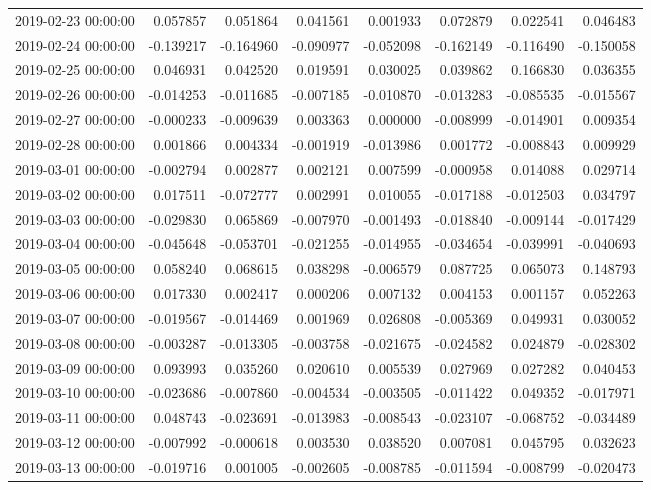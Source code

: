 \begin{tabular}{lrrrrrrr}
2019-02-23 00:00:00 & 0.057857 & 0.051864 & 0.041561 & 0.001933 & 0.072879 & 0.022541 & 0.046483 \\
2019-02-24 00:00:00 & -0.139217 & -0.164960 & -0.090977 & -0.052098 & -0.162149 & -0.116490 & -0.150058 \\
2019-02-25 00:00:00 & 0.046931 & 0.042520 & 0.019591 & 0.030025 & 0.039862 & 0.166830 & 0.036355 \\
2019-02-26 00:00:00 & -0.014253 & -0.011685 & -0.007185 & -0.010870 & -0.013283 & -0.085535 & -0.015567 \\
2019-02-27 00:00:00 & -0.000233 & -0.009639 & 0.003363 & 0.000000 & -0.008999 & -0.014901 & 0.009354 \\
2019-02-28 00:00:00 & 0.001866 & 0.004334 & -0.001919 & -0.013986 & 0.001772 & -0.008843 & 0.009929 \\
2019-03-01 00:00:00 & -0.002794 & 0.002877 & 0.002121 & 0.007599 & -0.000958 & 0.014088 & 0.029714 \\
2019-03-02 00:00:00 & 0.017511 & -0.072777 & 0.002991 & 0.010055 & -0.017188 & -0.012503 & 0.034797 \\
2019-03-03 00:00:00 & -0.029830 & 0.065869 & -0.007970 & -0.001493 & -0.018840 & -0.009144 & -0.017429 \\
2019-03-04 00:00:00 & -0.045648 & -0.053701 & -0.021255 & -0.014955 & -0.034654 & -0.039991 & -0.040693 \\
2019-03-05 00:00:00 & 0.058240 & 0.068615 & 0.038298 & -0.006579 & 0.087725 & 0.065073 & 0.148793 \\
2019-03-06 00:00:00 & 0.017330 & 0.002417 & 0.000206 & 0.007132 & 0.004153 & 0.001157 & 0.052263 \\
2019-03-07 00:00:00 & -0.019567 & -0.014469 & 0.001969 & 0.026808 & -0.005369 & 0.049931 & 0.030052 \\
2019-03-08 00:00:00 & -0.003287 & -0.013305 & -0.003758 & -0.021675 & -0.024582 & 0.024879 & -0.028302 \\
2019-03-09 00:00:00 & 0.093993 & 0.035260 & 0.020610 & 0.005539 & 0.027969 & 0.027282 & 0.040453 \\
2019-03-10 00:00:00 & -0.023686 & -0.007860 & -0.004534 & -0.003505 & -0.011422 & 0.049352 & -0.017971 \\
2019-03-11 00:00:00 & 0.048743 & -0.023691 & -0.013983 & -0.008543 & -0.023107 & -0.068752 & -0.034489 \\
2019-03-12 00:00:00 & -0.007992 & -0.000618 & 0.003530 & 0.038520 & 0.007081 & 0.045795 & 0.032623 \\
2019-03-13 00:00:00 & -0.019716 & 0.001005 & -0.002605 & -0.008785 & -0.011594 & -0.008799 & -0.020473 \\

\end{tabular}
